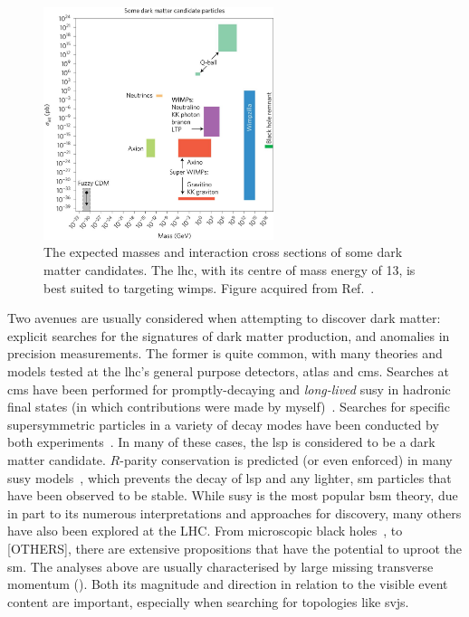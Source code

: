 \begin{figure}[htbp]
    \centering
    \includegraphics[width=0.6\textwidth]{figures/dm_masses_xsecs.jpg}
    \caption[The expected masses and interaction cross sections of some dark matter candidates. The LHC, with its centre of mass energy of 13\TeV, is best suited to targeting WIMPs]{The expected masses and interaction cross sections of some dark matter candidates. The \acrshort{lhc}, with its centre of mass energy of 13\TeV, is best suited to targeting \glspl{wimp}. Figure acquired from Ref.~.}
    \label{fig:dm_masses_xsecs}
\end{figure}

Two avenues are usually considered when attempting to discover dark matter: explicit searches for the signatures of dark matter production, and anomalies in precision measurements. The former is quite common, with many theories and models tested at the \acrshort{lhc}'s general purpose detectors, \acrshort{atlas} and \acrshort{cms}. Searches at \acrshort{cms} have been performed for promptly-decaying and \emph{long-lived} \acrlong{susy} in hadronic final states (in which contributions were made by myself)~\cite{CMS-PAPER-SUS-15-005-published,SUS16038published}. Searches for specific supersymmetric particles in a variety of decay modes have been conducted by both experiments~\cite{CANEPA2019100033}. In many of these cases, the \acrfull{lsp} is considered to be a dark matter candidate. $R$-parity conservation is predicted (or even enforced) in many \acrshort{susy} models~\cite{Martin:1997ns}, which prevents the decay of \acrshort{lsp} and any lighter, \acrlong{sm} particles that have been observed to be stable. While \acrlong{susy} is the most popular \acrshort{bsm} theory, due in part to its numerous interpretations and approaches for discovery, many others have also been explored at the LHC. From microscopic black holes~\cite{Khachatryan:2010wx}, to [OTHERS], there are extensive propositions that have the potential to uproot the \acrlong{sm}. The analyses above are usually characterised by large missing transverse momentum (\ptvecmiss). Both its magnitude and direction in relation to the visible event content are important, especially when searching for topologies like \glspl{svj}. 

